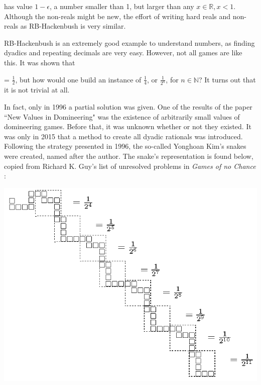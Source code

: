 has value $1-\epsilon$, a number smaller than 1, but larger than any $x \in \mathbb{R}, x < 1$. Although the non-reals might be new, the effort of writing hard reals and non-reals as RB-Hackenbush is very similar.

RB-Hackenbush is an extremely good example to understand numbers, as finding dyadics and repeating decimals are very easy. However, not all games are like this. It was shown that
 = $\frac{1}{2}$, but how would one build an instance of $\frac{1}{4}$, or $\frac{1}{2^n}$, for $n\in\mathbb{N}$? It turns out that it is not trivial at all.

In fact, only in 1996 a partial solution was given. One of the results of the paper ``New Values in Domineering" \cite{10} was the existence of arbitrarily small values of domineering games. Before that, it was unknown whether or not they existed. It was only in 2015 \cite{11} that a method to create all dyadic rationals was introduced. Following the strategy presented in 1996, the so-called Yonghoan Kim's snakes were created, named after the author. The snake's representation is found below, copied from Richard K. Guy's list of unresolved problems in \textit{Games of no Chance} \cite{GONC}:

\vspace{1cm}\hspace{-2cm}
\includegraphics[scale=0.9]{../images/kims_snakes.png}

